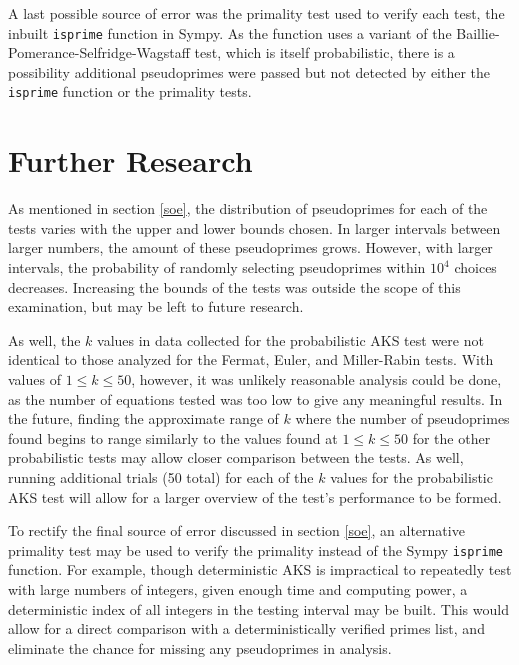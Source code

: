 \documentclass{article}
\begin{document}
A last possible source of error was the primality test used to verify each test, the inbuilt \texttt{isprime} function in Sympy. As the function uses a variant of the Baillie-Pomerance-Selfridge-Wagstaff test, which is itself probabilistic, there is a possibility additional pseudoprimes were passed but not detected by either the \texttt{isprime} function or the primality tests.

\section{Further Research}
As mentioned in section \ref{soe}, the distribution of pseudoprimes for each of the tests varies with the upper and lower bounds chosen. In larger intervals between larger numbers, the amount of these pseudoprimes grows. However, with larger intervals, the probability of randomly selecting pseudoprimes within $10^4$ choices decreases. Increasing the bounds of the tests was outside the scope of this examination, but may be left to future research. 

As well, the $k$ values in data collected for the probabilistic AKS test were not identical to those analyzed for the Fermat, Euler, and Miller-Rabin tests. With values of $1 \leq k \leq 50$, however, it was unlikely reasonable analysis could be done, as the number of equations tested was too low to give any meaningful results. In the future, finding the approximate range of $k$ where the number of pseudoprimes found begins to range similarly to the values found at $1 \leq k \leq 50$ for the other probabilistic tests may allow closer comparison between the tests. As well, running additional trials (50 total) for each of the $k$ values for the probabilistic AKS test will allow for a larger overview of the test's performance to be formed.

To rectify the final source of error discussed in section \ref{soe}, an alternative primality test may be used to verify the primality instead of the Sympy \texttt{isprime} function. For example, though deterministic AKS is impractical to repeatedly test with large numbers of integers, given enough time and computing power, a deterministic index of all integers in the testing interval may be built. This would allow for a direct comparison with a deterministically verified primes list, and eliminate the chance for missing any pseudoprimes in analysis.
\end{document}
